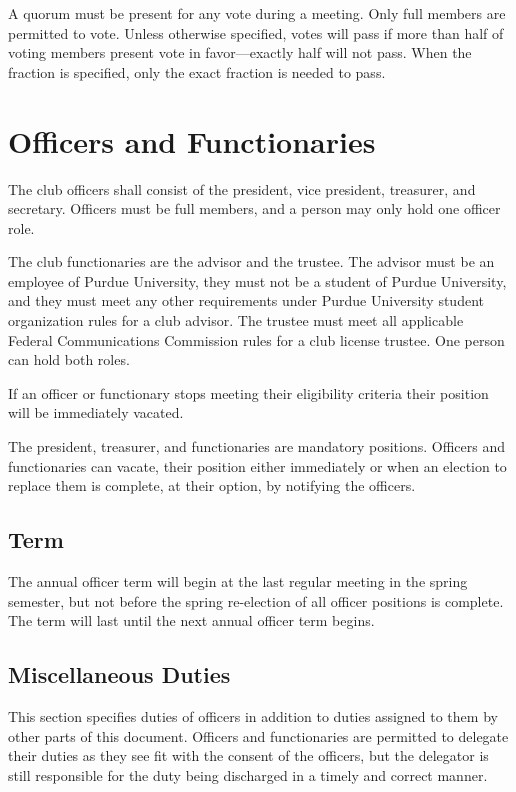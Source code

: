 \documentclass{article}
\begin{document}
A quorum must be present for any vote during a meeting. Only full members are
permitted to vote. Unless otherwise specified, votes will pass if more than half
of voting members present vote in favor---exactly half will not pass. When the
fraction is specified, only the exact fraction is needed to pass.

\section{Officers and Functionaries}

The club officers shall consist of the president, vice president, treasurer, and
secretary. Officers must be full members, and a person may only hold one officer
role.

The club functionaries are the advisor and the trustee. The advisor must be an
employee of Purdue University, they must not be a student of Purdue University,
and they must meet any other requirements under Purdue University student
organization rules for a club advisor. The trustee must meet all applicable
Federal Communications Commission rules for a club license trustee. One person
can hold both roles.

If an officer or functionary stops meeting their eligibility criteria their
position will be immediately vacated.

The president, treasurer, and functionaries are mandatory positions. Officers
and functionaries can vacate, their position either immediately or when an
election to replace them is complete, at their option, by notifying the
officers.

\subsection{Term}

The annual officer term will begin at the last regular meeting in the spring
semester, but not before the spring re-election of all officer positions is
complete. The term will last until the next annual officer term begins.

\subsection{Miscellaneous Duties}

This section specifies duties of officers in addition to duties assigned to them
by other parts of this document. Officers and functionaries are permitted to
delegate their duties as they see fit with the consent of the officers, but the
delegator is still responsible for the duty being discharged in a timely and
correct manner.
\end{document}
